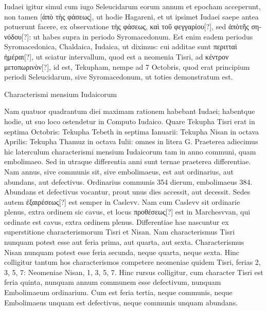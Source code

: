 Iudaei igitur simul cum iugo
 Seleucidarum eorum annum et epocham
acceperunt, non tamen \textgreek{[ἀπὸ τὴς φάσεως]},
 ut hodie Hagareni, et ut ipsimet
Iudaei saepe antea potuerunt facere, ex observatione
 \textgreek{τὴς φάσεως, καὶ τοῦ φεγγαρίου[?]},
sed \textgreek{ἀπὸτῆς σηνόδου[?]}: ut habes supra in periodo Syromacedonum.
Est enim eadem periodus Syromacedonica, Chaldaica, Iudaica, ut diximus:
cui additae sunt \textgreek{περιτταὶ ἡμέραι[?]}, ut sciatur intervallum, quod est
a neomenia Tisri, ad \textgreek{κέντρον μετοπωρινὸν[?]},
 id est, Tekupham, nempe ad 7
Octobris, quod erat principium periodi Seleucidarum, sive Syromacedonum,
ut toties demonstratum
est.

\begin{table}[htbp]
  \centering
  
  \caption{Characterismi mensium Iudaicorum}
\end{table}

Nam quatuor quadrantum
diei maximam rationem
habebant Iudaei; habentque
hodie, ut suo loco ostendetur
in Computo Iudaico.
Quare Tekupha Tisri erat in
septima Octobris: Tekupha
Tebeth in septima Ianuarii:
Tekupha Nisan in octava Aprilis:
Tekupha Thamuz in octava
Iulii: omnes in litera G.
Praeterea adiecimus hic laterculum
characterismi mensium
Iudaicorum tam in anno communi,
quam embolimaeo.
Sed in utraque differentia anni sunt ternae
praeterea differentiae.
Nam annus, sive communis sit, sive embolimaeus,
est aut ordinarius, aut abundans, aut defectivus.
Ordinarius communis
354 dierum, embolimaeus 384.
Abundans et defectivus vocantur,
prout unus dies accessit, aut decessit.
Sedes autem \textgreek{ἐξαιρέσεως[?]} est semper
in Caslevv.
Nam cum Caslevv sit ordinarie plenus, extra ordinem sic
cavus, et locus \textgreek{προθέσεως[?]} est in Marchesvvan,
 qui ordinate est cavus,
extra ordinem plenus.
Differentiae hae nascuntur ex superstitione characterismorum
Tisri et Nisan.
Nam characterismus Tisri nunquam
potest esse aut feria prima, aut quarta, aut sexta.
Characterismus Nisan
nunquam potest esse feria secunda, neque quarta, neque sexta.
Hinc
colligitur tantum hos characterismos competere neomeniae quidem
Tisri, ferias 2, 3, 5, 7: Neomeniae Nisan, 1, 3, 5, 7.
Hinc rursus colligitur,
cum character Tisri est feria quinta, nunquam annum communem
esse defectivum, nunquam Embolimaeum ordinarium.
Cum est feria
tertia, neque communis, neque Embolimaeus unquam est defectivus,
neque communis unquam abundans.

